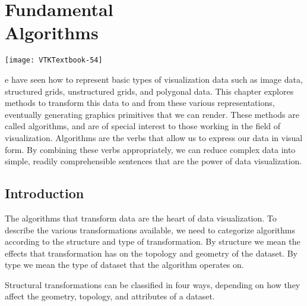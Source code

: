 \chapter[Fundamental Algorithms]{Fundamental\\ Algorithms}
\label{chap:fundamental_algorithms}

\vspace{-9\baselineskip} %
\hfill
 \begin{minipage}{0.5\textwidth}
 \centering
 \texttt{[image: VTKTextbook-54]}
 \end{minipage}
\vspace{2\baselineskip}

e have seen how to represent basic types of visualization data such as image data, structured grids, unstructured grids, and polygonal data.
This chapter explores methods to transform this data to and from these various representations, eventually generating graphics primitives that we can render.
These methods are called algorithms, and are of special interest to those working in the field of visualization.
Algorithms are the verbs that allow us to express our data in visual form.
By combining these verbs appropriately, we can reduce complex data into simple, readily comprehensible sentences that are the power of data visualization.

\section{Introduction}

The algorithms that transform data are the heart of data visualization.
To describe the various transformations available, we need to categorize algorithms according to the structure and type of transformation.
By structure we mean the effects that transformation has on the topology and geometry of the dataset.
By type we mean the type of dataset that the algorithm operates on.

Structural transformations can be classified in four ways, depending on how they affect the geometry, topology, and attributes of a dataset.

